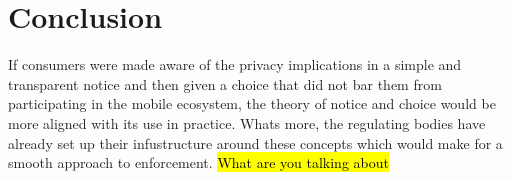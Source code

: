 \section{Conclusion}

If consumers were made aware of the privacy implications in a simple and transparent notice and then given a choice that did not bar them from participating in the mobile ecosystem, the theory of notice and choice would be more aligned with its use in practice. Whats more, the regulating bodies have already set up their infustructure around these concepts which would make for a smooth approach to enforcement. \hl{What are you talking about}

